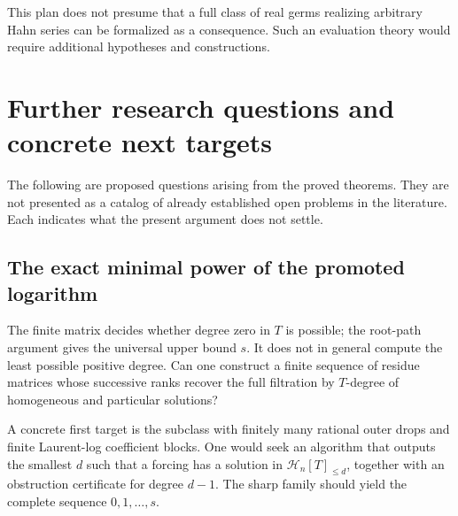 \documentclass[11pt,a4paper]{article}
\numberwithin{equation}{section}
\theoremstyle{definition}
\theoremstyle{remark}
\newcommand{\HH}{\mathcal H}
\begin{document}
This plan does not presume that a full class of real germs realizing arbitrary Hahn series can be formalized as a consequence. Such an evaluation theory would require additional hypotheses and constructions.

\section{Further research questions and concrete next targets}
\label{sec:questions}
The following are proposed questions arising from the proved theorems. They are not presented as a catalog of already established open problems in the literature. Each indicates what the present argument does not settle.

\subsection{The exact minimal power of the promoted logarithm}
The finite matrix decides whether degree zero in $T$ is possible; the root-path argument gives the universal upper bound $s$. It does not in general compute the least possible positive degree. Can one construct a finite sequence of residue matrices whose successive ranks recover the full filtration by $T$-degree of homogeneous and particular solutions?

A concrete first target is the subclass with finitely many rational outer drops and finite Laurent-log coefficient blocks. One would seek an algorithm that outputs the smallest $d$ such that a forcing has a solution in $\HH_n[T]_{\le d}$, together with an obstruction certificate for degree $d-1$. The sharp family should yield the complete sequence $0,1,\ldots,s$.
\end{document}
